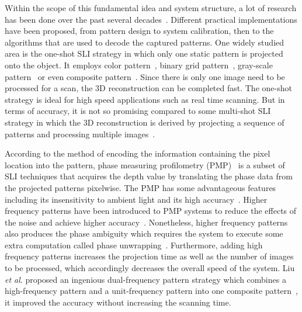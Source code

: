 \documentclass[]{spie}  %
\begin{document}
Within the scope of this fundamental idea and system structure, a lot of research has been done over the past several decades~\cite{geng11}. Different practical implementations have been proposed, from pattern design to system calibration, then to the algorithms that are used to decode the captured patterns. One widely studied area is the one-shot SLI strategy in which only one static pattern is projected onto the object. It employs color pattern~\cite{wust91}, binary grid pattern~\cite{grin92}, gray-scale pattern~\cite{durd98} or even composite pattern~\cite{guan08}. Since there is only one image need to be processed for a scan, the 3D reconstruction can be completed fast. The one-shot strategy is ideal for high speed applications such as real time scanning. But in terms of accuracy, it is not so promising compared to some multi-shot SLI strategy in which the 3D reconstruction is derived by projecting a sequence of patterns and processing multiple images~\cite{blai03}.

According to the method of encoding the information containing the pixel location into the pattern, phase measuring profilometry (PMP)~\cite{srin85} is a subset of SLI techniques that acquires the depth value by translating the phase data from the projected patterns pixelwise. The PMP has some advantageous features including its insensitivity to ambient light and its high accuracy~\cite{guan03, hali89}. Higher frequency patterns have been introduced to PMP systems to reduce the effects of the noise and achieve higher accuracy~\cite{lijl03}. Nonetheless, higher frequency patterns also produces the phase ambiguity which requires the system to execute some extra computation called phase unwrapping~\cite{song18}. Furthermore, adding high frequency patterns increases the projection time as well as the number of images to be processed, which accordingly decreases the overall speed of the system. Liu \textit{et al}. proposed an ingenious dual-frequency pattern strategy which combines a high-frequency pattern and a unit-frequency pattern into one composite pattern~\cite{liuk10}, it improved the accuracy without increasing the scanning time.
\end{document}
